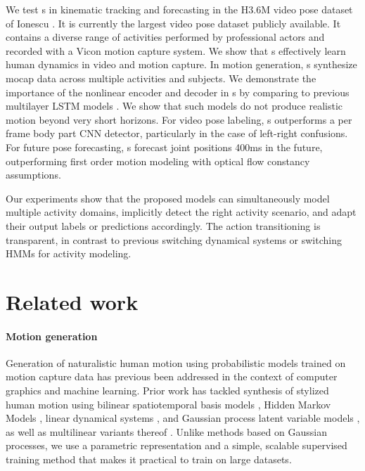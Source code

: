 \documentclass[10pt,twocolumn,letterpaper]{article}
\begin{document}
We test s in kinematic tracking and forecasting in the H3.6M video pose dataset  of Ionescu  \cite{h36m_pami}. It is currently the largest video pose dataset publicly available. It contains a diverse range of activities performed by professional actors and recorded with a Vicon motion capture system. We show that s effectively learn human dynamics in video and motion capture. In motion generation, s 
synthesize mocap  data across multiple activities and subjects. 
We demonstrate the importance of the nonlinear encoder and decoder in s by comparing to previous multilayer LSTM  models \cite{DBLP:journals/corr/Graves13}. We show that such models do not produce realistic motion beyond very short horizons. 
For video pose labeling,  s outperforms a per frame body part CNN detector, particularly in the case of left-right confusions.  For future pose forecasting,  s   forecast joint positions 400ms in the future, outperforming first order motion modeling with optical flow constancy assumptions. 

Our experiments show that the proposed   models can simultaneously model multiple activity domains,  implicitly detect the right activity scenario, and adapt their output labels or predictions accordingly. The action transitioning is  transparent,  in contrast to previous switching dynamical systems or switching HMMs \cite{prm-lslmh-00,Fox:IEEESPM2010} for activity modeling. 









 



 \section{Related work} \label{sec:related}

\paragraph{Motion generation}







Generation of naturalistic human motion using probabilistic models trained on motion capture data has previous been addressed in the context of computer graphics and machine learning. Prior work has tackled synthesis of stylized human motion using bilinear spatiotemporal basis models \cite{Akhter:2012:BilinearBasis},  Hidden Markov Models \cite{bh-sm-00}, linear dynamical systems \cite{prm-lslmh-00},  and Gaussian process latent variable models \cite{wfh-gpdmh-08,ufgpd-tclvm-08},  as well as multilinear variants thereof \cite{hpp-sthm-05,wfh-mgpms-07}. Unlike methods based on Gaussian processes, we use a parametric representation and a simple, scalable supervised training method that makes it practical to train on large datasets.
\end{document}
